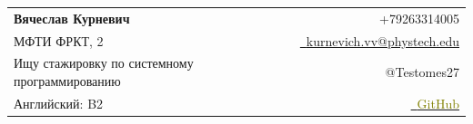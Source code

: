 \documentclass[a4paper,11pt]{article}
\makeatletter
\newcommand{\resumeSubheading}[4]{
\vspace{0.5mm}\item
    \begin{tabular*}{0.98\textwidth}[t]{l@{\extracolsep{\fill}}r}
        \textbf{#1} & \textit{\footnotesize{#4}} \\
        \textit{\footnotesize{#3}} &  \footnotesize{#2}\\
    \end{tabular*}
    \vspace{-2.4mm}
}
\newcommand{\resumeSubHeadingListStart}{\begin{itemize}[leftmargin=*,labelsep=0mm]}
\newcommand{\resumeItemListStart}{\begin{justify}\begin{itemize}[leftmargin=3ex, rightmargin=2ex, noitemsep,labelsep=1.2mm,itemsep=0mm]\small}
\newcommand{\resumeSubHeadingListEnd}{\end{itemize}\vspace{2mm}}
\newcommand{\resumeItemListEnd}{\end{itemize}\end{justify}\vspace{-2mm}}
\newcommand{\name}{Вячеслав Курневич} %
\newcommand{\course}{МФТИ ФРКТ} %
\newcommand{\roll}{2} %
\newcommand{\phone}{+79263314005} %
\newcommand{\emaila}{kurnevich.vv@phystech.edu} %
\makeatother
\begin{document}
\selectfont



\parbox{\linewidth}{
\begin{tabularx}{\linewidth}{L r} \\
  \textbf{\Large \name} & {\raisebox{0.0\height}{\footnotesize \faPhone}\ \phone}\\
  {\course, \roll {}} & \href{mailto:\emaila}{\raisebox{0.0\height}{\footnotesize \faEnvelope}\ {\emaila}} \\
  Ищу стажировку по системному программированию &  {\raisebox{0.0\height}{\footnotesize \faTelegram}\ {@Testomes27}} \\
   Английский: B2 &  \href{https://github.com/kand1bober/}{\raisebox{0.0\height}{\footnotesize \faGithub}\ \textcolor{olive}{{GitHub}}} \\
\end{tabularx}
}





    
\end{document}

